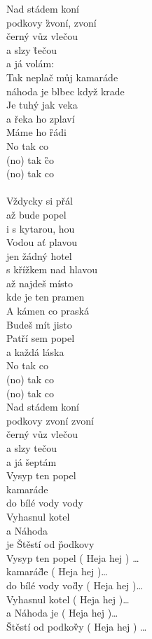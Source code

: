 
\begin{multicols}{2}

\D Nad stádem \A koní \Emi\\
podkovy \G zvoní, zvoní\D\\
černý vůz \A vlečou \Emi\\
a slzy \G tečou\\
a já vo\D lám:\\


Tak neplač můj kamaráde\\
náhoda je blbec když krade\\

Je \D tuhý jak \A veka\\
a řeka ho zpla\Emi ví\\
Máme ho \G rádi\\
No tak \C co\\
(no) tak \G co\\
(no) tak \A co\\\\


Vždycky si přál\\
až bude popel\\
i s kytarou, hou\\
Vodou ať plavou\\
jen žádný hotel\\
s křížkem nad hlavou\\

až najdeš místo\\
 kde je ten pramen\\
 A kámen co praská\\
 Budeš mít jisto\\
 Patří sem popel\\
 a každá láska\\
 No tak co\\
 (no) tak co\\
 (no) tak co\\

Nad stádem koní\\
 podkovy zvoní zvoní\\
 černý vůz vlečou\\
 a slzy tečou\\
 a já šeptám\\

Vysyp ten popel\\
 kamaráde\\
 do bílé vody vody\\
 Vyhasnul kotel\\
 a Náhoda\\
 je Štěstí od \G podkovy\\

Vysyp ten \D popel ( Heja hej ) \ldots\\
\A kamará\G de ( Heja hej )\ldots\\
 do bílé \D vody \A vo\G dy ( Heja hej )\ldots\\ 
Vyhasnul \D kotel ( Heja hej )\ldots\\
 a \A Náhoda \Emi je ( Heja hej )\ldots\\
 Štěstí od podko\G vy ( Heja hej ) \ldots\\
\end{multicols}
